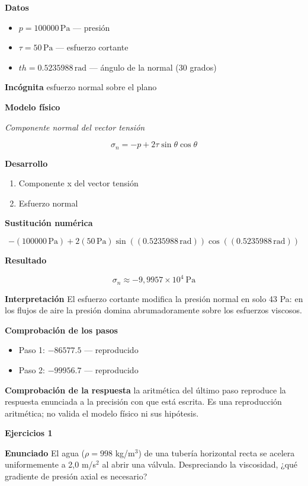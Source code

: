 \documentclass[10pt,openany]{book}
\begin{document}
\noindent\textbf{Datos}
\begin{itemize}
\item $p = 100000\,\mathrm{Pa}$ — presión
\item $\tau = 50\,\mathrm{Pa}$ — esfuerzo cortante
\item $th = 0.5235988\,\mathrm{rad}$ — ángulo de la normal (30 grados)
\end{itemize}

\noindent\textbf{Incógnita}
esfuerzo normal sobre el plano

\noindent\textbf{Modelo físico}

\noindent\textit{Componente normal del vector tensión}

\[
\sigma_n = -p + 2\tau\sin\theta\cos\theta
\]

\noindent\textbf{Desarrollo}
\begin{enumerate}
\item
Componente x del vector tensión
\item
Esfuerzo normal
\end{enumerate}

\noindent\textbf{Sustitución numérica}

\[
- \left(100000\,\mathrm{Pa}\right) + 2 \left(50\,\mathrm{Pa}\right) \sin{\left(\left(0.5235988\,\mathrm{rad}\right) \right)} \cos{\left(\left(0.5235988\,\mathrm{rad}\right) \right)}
\]

\noindent\textbf{Resultado}

\[
\sigma_n \approx -9{,}9957\times 10^{4}\ \mathrm{Pa}
\]

\noindent\textbf{Interpretación}
El esfuerzo cortante modifica la presión normal en solo 43 Pa: en los flujos de aire la presión domina abrumadoramente sobre los esfuerzos viscosos.

\noindent\textbf{Comprobación de los pasos}
\begin{itemize}
\item Paso 1: $-86577.5$ — reproducido
\item Paso 2: $-99956.7$ — reproducido
\end{itemize}

\noindent\textbf{Comprobación de la respuesta} la aritmética del último paso reproduce la respuesta enunciada a la precisión con que está escrita. Es una reproducción aritmética; no valida el modelo físico ni sus hipótesis.

\noindent\textbf{Ejercicios 1}

\noindent\textbf{Enunciado}
El agua (\(\rho = 998\) kg/m\(^3\)) de una tubería horizontal recta se acelera uniformemente a 2,0 m/s\(^2\) al abrir una válvula. Despreciando la viscosidad, ¿qué gradiente de presión axial es necesario?
\end{document}
